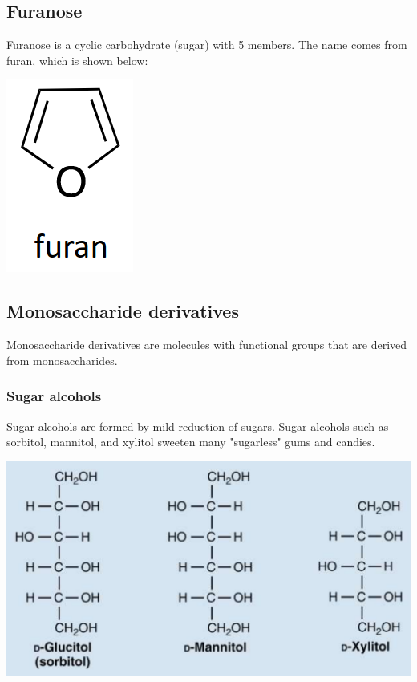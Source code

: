 \documentclass[11pt]{article}
\begin{document}
\subsection{Furanose}
\label{sec:orgfe52e0a}
Furanose is a cyclic carbohydrate (sugar) with 5 members. The name comes from furan, which is shown below:

\begin{center}
\includegraphics[scale=1.0]{./images/furan.png}
\end{center}

\subsection{Monosaccharide derivatives}
\label{sec:org9f04222}
Monosaccharide derivatives are molecules with functional groups that are derived from monosaccharides.

\subsubsection{Sugar alcohols}
\label{sec:org3961bc5}
Sugar alcohols are formed by mild reduction of sugars. Sugar alcohols such as sorbitol, mannitol, and xylitol sweeten many "sugarless" gums and candies.
\begin{center}
\includegraphics[width=.9\linewidth]{./images/sugar-alcohols.png}
\end{center}
\end{document}
